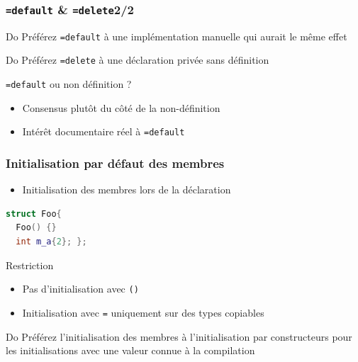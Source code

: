 \documentclass[C++.tex]{subfiles}
\begin{document}
\begin{frame}[fragile]
	\frametitle{\lstinline|=default| \& \lstinline|=delete|\titlehfill{}2/2}
	\begin{exampleblock}{Do}
		Préférez \lstinline|=default| à une implémentation manuelle qui aurait le même effet
	\end{exampleblock}

	\begin{exampleblock}{Do}
		Préférez \lstinline|=delete| à une déclaration privée sans définition
	\end{exampleblock}

	\begin{block}{\lstinline|=default| ou non définition ?}
		\begin{itemize}
			\item Consensus plutôt du côté de la non-définition
			\item Intérêt documentaire réel à \lstinline|=default|
		\end{itemize}
	\end{block}
\end{frame}

\begin{frame}[fragile]
	\frametitle{Initialisation par défaut des membres}
	\begin{itemize}
		\item Initialisation des membres lors de la déclaration
	\end{itemize}

	\begin{lstlisting}[language=C++]
struct Foo{
  Foo() {}
  int m_a{2}; };\end{lstlisting}

	\begin{alertblock}{Restriction}
		\begin{itemize}
			\item Pas d'initialisation avec \lstinline|()|
			\item Initialisation avec \lstinline|=| uniquement sur des types copiables
		\end{itemize}
	\end{alertblock}

	\begin{exampleblock}{Do}
		Préférez l'initialisation des membres à l'initialisation par constructeurs pour les initialisations avec une valeur connue à la compilation

	\end{exampleblock}
\end{frame}
\end{document}
